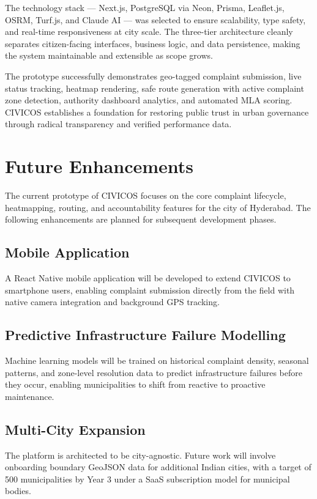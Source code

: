 \documentclass[12pt,a4paper]{report}
\begin{document}
The technology stack --- Next.js, PostgreSQL via Neon, Prisma, Leaflet.js,
OSRM, Turf.js, and Claude AI --- was selected to ensure scalability, type
safety, and real-time responsiveness at city scale. The three-tier
architecture cleanly separates citizen-facing interfaces, business logic,
and data persistence, making the system maintainable and extensible as
scope grows.

The prototype successfully demonstrates geo-tagged complaint submission,
live status tracking, heatmap rendering, safe route generation with active
complaint zone detection, authority dashboard analytics, and automated MLA
scoring. CIVICOS establishes a foundation for restoring public trust in
urban governance through radical transparency and verified performance data.

\chapter{Future Enhancements}

The current prototype of CIVICOS focuses on the core complaint lifecycle,
heatmapping, routing, and accountability features for the city of Hyderabad.
The following enhancements are planned for subsequent development phases.

\section{Mobile Application}
A React Native mobile application will be developed to extend CIVICOS to
smartphone users, enabling complaint submission directly from the field with
native camera integration and background GPS tracking.

\section{Predictive Infrastructure Failure Modelling}
Machine learning models will be trained on historical complaint density,
seasonal patterns, and zone-level resolution data to predict infrastructure
failures before they occur, enabling municipalities to shift from reactive
to proactive maintenance.

\section{Multi-City Expansion}
The platform is architected to be city-agnostic. Future work will involve
onboarding boundary GeoJSON data for additional Indian cities, with a target
of 500 municipalities by Year 3 under a SaaS subscription model for
municipal bodies.
\end{document}
